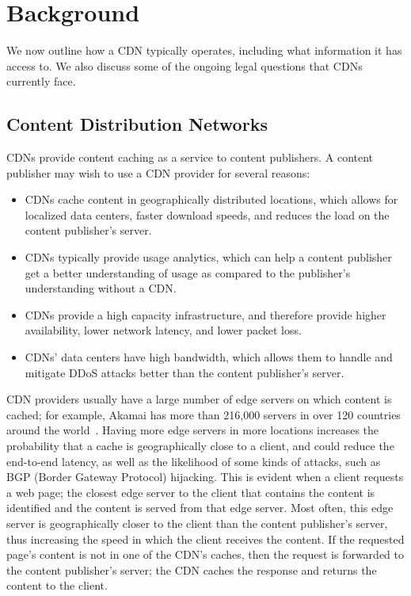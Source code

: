 \section{Background}
\label{sec:background}

We now outline how a CDN typically operates, including what information it
has access to. We also discuss some of the ongoing legal
questions that CDNs currently face.

\subsection{Content Distribution Networks}
CDNs provide content caching as a service to content publishers.  A 
content publisher may wish to use a CDN provider for several reasons:

\begin{itemize}
\item CDNs cache content in geographically distributed locations, which allows for localized data centers, faster download speeds, and reduces the load on the content publisher's server.
\item CDNs typically provide usage analytics, which can help a content publisher get a better understanding of usage as compared to the publisher's understanding without a CDN.
\item CDNs provide a high capacity infrastructure, and therefore provide higher availability, lower network latency, and lower packet loss.  
\item CDNs' data centers have high bandwidth, which allows them to handle and mitigate DDoS attacks better than the content publisher's server.
\end{itemize}

CDN providers usually have a large number of edge servers on which content is cached; for example, Akamai has more than 216,000 servers in over 120 countries around the world~\cite{akamai_facts}.  Having more edge servers in more locations increases the probability that a cache is geographically close to a client, and could reduce the end-to-end latency, as well as the likelihood of some kinds of attacks, such as BGP (Border Gateway Protocol) hijacking.  This is evident when a client requests a web page; the closest edge server to the client that contains the content is identified and the content is served from that edge server.  Most often, this edge server is geographically closer to the client than the content publisher's server, thus increasing the speed in which the client receives the content. If the requested page's content is not in one of the CDN's caches, then the request is forwarded to the content publisher's server; the CDN caches the response and returns the content to the client. 

